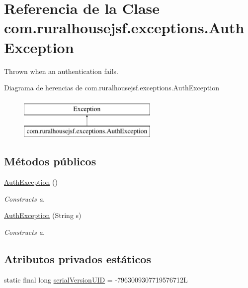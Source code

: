 \hypertarget{a00204}{}\section{Referencia de la Clase com.\+ruralhousejsf.\+exceptions.\+Auth\+Exception}
\label{a00204}


Thrown when an authentication fails.  


Diagrama de herencias de com.\+ruralhousejsf.\+exceptions.\+Auth\+Exception\begin{figure}[H]
\begin{center}
\leavevmode
\includegraphics[height=2.000000cm]{a00204}
\end{center}
\end{figure}
\subsection*{Métodos públicos}
\begin{DoxyCompactItemize}
\item 
\mbox{\hyperlink{a00204_a092e5eb20bddab6f6741d8a04c7f05a2}{Auth\+Exception}} ()
\begin{DoxyCompactList}\small\item\em Constructs a. \end{DoxyCompactList}\item 
\mbox{\hyperlink{a00204_ac4b5a1b9673da9a2de397154017a0c1e}{Auth\+Exception}} (String s)
\begin{DoxyCompactList}\small\item\em Constructs a. \end{DoxyCompactList}\end{DoxyCompactItemize}
\subsection*{Atributos privados estáticos}
\begin{DoxyCompactItemize}
\item 
static final long \mbox{\hyperlink{a00204_a0bda3b553296d4340933a563b323bb5f}{serial\+Version\+U\+ID}} = -\/7963009307719576712L
\end{DoxyCompactItemize}



